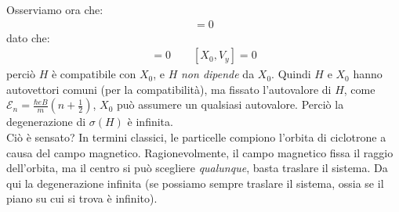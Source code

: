 \documentclass[../../FisicaTeorica.tex]{subfiles}
\begin{document}
\begin{enumerate}
Osserviamo ora che:
\begin{align*}
[H, X_0] = 0
\end{align*}
dato che:
\begin{align*}
[X_0, V_x]=0\qquad [X_0, V_y]=0
\end{align*} 
perciò $H$ è compatibile con $X_0$, e $H$ \textit{non dipende} da $X_0$. Quindi $H$ e $X_0$ hanno autovettori comuni (per la compatibilità), ma fissato l'autovalore di $H$, come $\mathcal{E}_n = \frac{\hbar eB}{m}\left(n+\frac{1}{2}\right)$, $X_0$ può assumere un qualsiasi autovalore. Perciò la degenerazione di $\sigma(H)$ è infinita.\\
Ciò è sensato? In termini classici, le particelle compiono l'orbita di ciclotrone a causa del campo magnetico. Ragionevolmente, il campo magnetico fissa il raggio dell'orbita, ma il centro si può scegliere \textit{qualunque}, basta traslare il sistema. Da qui la degenerazione infinita (se possiamo sempre traslare il sistema, ossia se il piano su cui si trova è infinito).


\end{enumerate}
\end{document}
